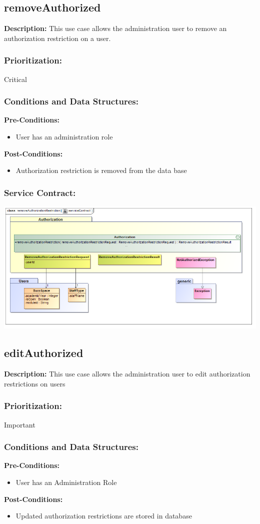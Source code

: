 \subsection{removeAuthorized}
\textbf{Description:}
This use case allows the administration user to remove an authorization restriction on a user.
\subsubsection{Prioritization:}
Critical
\subsubsection{Conditions and Data Structures:}
\textbf{Pre-Conditions:}
\begin{itemize}
	\item User has an administration role	
\end{itemize}
\textbf{Post-Conditions:}
\begin{itemize}
	\item Authorization restriction is removed from the data base
\end{itemize}
\subsubsection{Service Contract:}
\includegraphics[width=1\linewidth]{./Graphics/RemoveAuth}

\subsection{editAuthorized}
\textbf{Description:}
This use case allows the administration user to edit authorization restrictions on users
\subsubsection{Prioritization:}
Important
\subsubsection{Conditions and Data Structures:}
\textbf{Pre-Conditions:}
\begin{itemize}
	\item User has an Administration Role
\end{itemize}
\textbf{Post-Conditions:}
\begin{itemize}
	\item Updated authorization restrictions are stored in database
\end{itemize}
